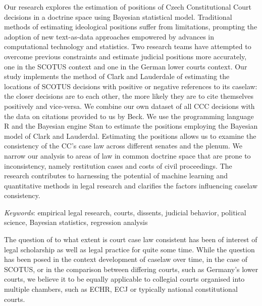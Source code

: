 \documentclass[
  11pt,
]{article}
\renewenvironment{abstract}
 {{%
    \setlength{\leftmargin}{0mm}
    \setlength{\rightmargin}{\leftmargin}%
  }%
  \relax}
 {\endlist}
\begin{document}
\begin{abstract}


    \vskip 8.5pt %

\noindent \small{Our research explores the estimation of positions of
Czech Constitutional Court decisions in a doctrine space using Bayesian
statistical model. Traditional methods of estimating ideological
positions suffer from limitations, prompting the adoption of new
text-as-data approaches empowered by advances in computational
technology and statistics. Two research teams have attempted to overcome
previous constraints and estimate judicial positions more accurately,
one in the SCOTUS context and one in the German lower courts context.
Our study implements the method of Clark and Lauderdale of estimating
the locations of SCOTUS decisions with positive or negative references
to its caselaw: the closer decisions are to each other, the more likely
they are to cite themselves positively and vice-versa. We combine our
own dataset of all CCC decisions with the data on citations provided to
us by Beck. We use the programming language R and the Bayesian engine
Stan to estimate the positions employing the Bayesian model of Clark and
Lauderdal. Estimating the positions allows us to examine the consistency
of the CC's case law across different senates and the plenum. We narrow
our analysis to areas of law in common doctrine space that are prone to
inconsistency, namely restitution cases and costs of civil proceedings.
The research contributes to harnessing the potential of machine learning
and quantitative methods in legal research and clarifies the factors
influencing caselaw consistency.}


\vskip 8.5pt \noindent \emph{Keywords}: empirical legal research,
courts, dissents, judicial behavior, political science, Bayesian
statistics, regression analysis \par




\end{abstract}


\vskip -8.5pt




\setlength{\parindent}{16pt}
\setlength{\parskip}{0pt}

\doublespacing
The question of to what extent is court case law consistent has been of
interest of legal scholarship as well as legal practice for quite some
time. While the question has been posed in the context development of
caselaw over time, in the case of SCOTUS, or in the comparison between
differing courts, such as Germany's lower courts, we believe it to be
equally applicable to collegial courts organised into multiple chambers,
such as ECHR, ECJ or typically national constitutional courts.
\end{document}
